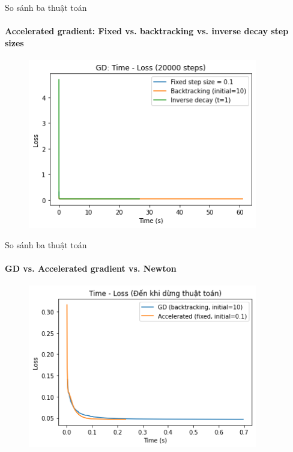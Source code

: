 \documentclass[10pt]{beamer}
\theoremstyle{remark}
\theoremstyle{definition}
\begin{document}
\begin{frame}[allowframebreaks]{So sánh ba thuật toán}
	\framesubtitle{Accelerated gradient: Fixed vs. backtracking vs. inverse decay step sizes }
	\begin{figure}[!htp]
		\centering
		\includegraphics[width=10cm]{Thinh/23.png}
	\end{figure}
\end{frame}

\begin{frame}[allowframebreaks]{So sánh ba thuật toán}
	\framesubtitle{GD vs. Accelerated gradient vs. Newton}
	\begin{figure}[!htp]
		\centering
		\includegraphics[width=10cm]{Thinh/24.png}
	\end{figure}
\end{frame}
\end{document}
